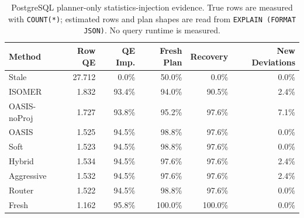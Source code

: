 \begin{table}[t]
  \centering
  \small
  \caption{PostgreSQL planner-only statistics-injection evidence. True rows are measured with \texttt{COUNT(*)}; estimated rows and plan shapes are read from \texttt{EXPLAIN (FORMAT JSON)}. No query runtime is measured.}
  \label{tab:postgres_planner_stats_injection}
  \setlength{\tabcolsep}{4pt}
  \begin{tabular}{lrrrrr}
    \toprule
    Method & Row QE & QE Imp. & Fresh Plan & Recovery & New Deviations \\
    \midrule
    Stale & 27.712 & 0.0\% & 50.0\% & 0.0\% & 0.0\% \\
    ISOMER & 1.832 & 93.4\% & 94.0\% & 90.5\% & 2.4\% \\
    OASIS-noProj & 1.727 & 93.8\% & 95.2\% & 97.6\% & 7.1\% \\
    OASIS & 1.525 & 94.5\% & 98.8\% & 97.6\% & 0.0\% \\
    Soft & 1.523 & 94.5\% & 98.8\% & 97.6\% & 0.0\% \\
    Hybrid & 1.534 & 94.5\% & 97.6\% & 97.6\% & 2.4\% \\
    Aggressive & 1.532 & 94.5\% & 97.6\% & 97.6\% & 2.4\% \\
    Router & 1.522 & 94.5\% & 98.8\% & 97.6\% & 0.0\% \\
    Fresh & 1.162 & 95.8\% & 100.0\% & 100.0\% & 0.0\% \\
    \bottomrule
  \end{tabular}
\end{table}
